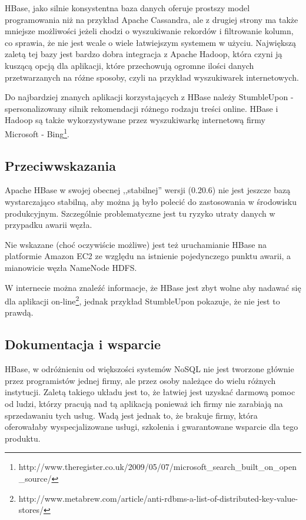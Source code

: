 HBase, jako silnie konsystentna baza danych oferuje prostszy model programowania niż na przykład Apache Cassandra, ale z drugiej strony ma także mniejsze możliwości jeżeli chodzi o wyszukiwanie rekordów i filtrowanie kolumn, co sprawia, że nie jest wcale o wiele łatwiejszym systemem w użyciu.
Największą zaletą tej bazy jest bardzo dobra integracja z Apache Hadoop, która czyni ją kuszącą opcją dla aplikacji, które przechowują ogromne ilości danych przetwarzanych na różne sposoby, czyli na przykład wyszukiwarek internetowych.

Do najbardziej znanych aplikacji korzystających z HBase należy StumbleUpon - spersonalizowany silnik rekomendacji różnego rodzaju treści online.
HBase i Hadoop są także wykorzystywane przez wyszukiwarkę internetową firmy Microsoft - Bing\footnote{http://www.theregister.co.uk/2009/05/07/microsoft\_search\_built\_on\_open\_source/}.

\subsection*{Przeciwwskazania}

Apache HBase w swojej obecnej ,,stabilnej'' wersji (0.20.6) nie jest jeszcze bazą wystarczająco stabilną, aby można ją było polecić do zastosowania w środowisku produkcyjnym.
Szczególnie problematyczne jest tu ryzyko utraty danych w przypadku awarii węzła.

Nie wskazane (choć oczywiście możliwe) jest też uruchamianie HBase na platformie Amazon EC2 ze względu na istnienie pojedynczego punktu awarii, a mianowicie węzła NameNode HDFS.

W internecie można znaleźć informacje, że HBase jest zbyt wolne aby nadawać się dla aplikacji on-line\footnote{http://www.metabrew.com/article/anti-rdbms-a-list-of-distributed-key-value-stores/}, jednak przykład StumbleUpon pokazuje, że nie jest to prawdą.

\subsection*{Dokumentacja i wsparcie}

HBase, w odróżnieniu od większości systemów NoSQL nie jest tworzone głównie przez programistów jednej firmy, ale przez osoby należące do wielu różnych instytucji.
Zaletą takiego układu jest to, że łatwiej jest uzyskać darmową pomoc od ludzi, którzy pracują nad tą aplikacją ponieważ ich firmy nie zarabiają na sprzedawaniu tych usług.
Wadą jest jednak to, że brakuje firmy, która oferowałaby wyspecjalizowane usługi, szkolenia i gwarantowane wsparcie dla tego produktu.

